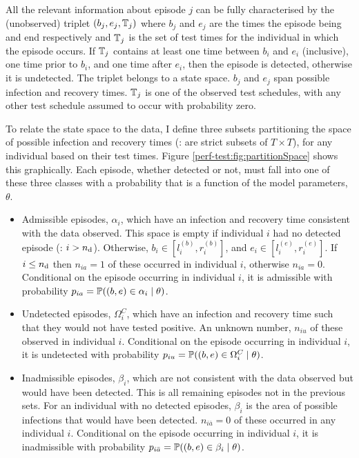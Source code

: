\documentclass[thesis.tex]{subfiles}
\begin{document}
All the relevant information about episode $j$ can be fully characterised by the (unobserved) triplet $(b_j, e_j, \mathbb{T}_j)$ where $b_j$ and $e_j$ are the times the episode being and end respectively and $\mathbb{T}_j$ is the set of test times for the individual in which the episode occurs. 
If $\mathbb{T}_j$ contains at least one time between $b_i$ and $e_i$ (inclusive), one time prior to $b_i$, and one time after $e_i$, then the episode is detected, otherwise it is undetected.
The triplet belongs to a state space.
$b_j$ and $e_j$ span possible infection and recovery times.
$\mathbb{T}_j$ is one of the observed test schedules, with any other test schedule assumed to occur with probability zero.

To relate the state space to the data, I define three subsets partitioning the space of possible infection and recovery times (\ie: are strict subsets of $T \times T$), for any individual based on their test times.
Figure \ref{perf-test:fig:partitionSpace} shows this graphically.
Each episode, whether detected or not, must fall into one of these three classes with a probability that is a function of the model parameters, $\theta$.

\begin{itemize}
\item
  Admissible episodes, $\alpha_i$, which have an infection and recovery time consistent with the data observed.
  This space is empty if individual $i$ had no detected episode (\ie: $i > n_\text{d}$).
  Otherwise, $b_i \in [l_i^{(b)}, r_i^{(b)}]$, and $e_i \in [l_i^{(e)}, r_i^{(e)}]$.
  If $i \leq n_\text{d}$ then $n_{ia} =1$ of these occurred in individual $i$, otherwise $n_{ia} = 0$.
  Conditional on the episode occurring in individual $i$, it is admissible with probability $p_{ia} = \operatorname{\mathbb{P}}((b, e) \in \alpha_i \mid \theta)$.
  \label{perf-test:def:admissible}
\item
  Undetected episodes, $\Omega_i^C$, which have an infection and recovery time such that they would not have tested positive.
  An unknown number, $n_{iu}$ of these observed in individual $i$.
  Conditional on the episode occurring in individual $i$, it is undetected with probability $p_{iu} = \operatorname{\mathbb{P}}((b, e) \in \Omega^C_i \mid \theta)$.
\item
  Inadmissible episodes, $\beta_i$, which are not consistent with the data observed but would have been
  detected.
  This is all remaining episodes not in the previous sets.
  For an individual with no detected episodes, $\beta_i$ is the area of possible infections that would have been detected.
  $n_{i\bar{a}} = 0$ of these occurred in any individual $i$.
  Conditional on the episode occurring in individual $i$, it is inadmissible with probability $p_{i\bar{a}} = \operatorname{\mathbb{P}}((b, e) \in \beta_i \mid \theta)$.
\end{itemize}
\end{document}
